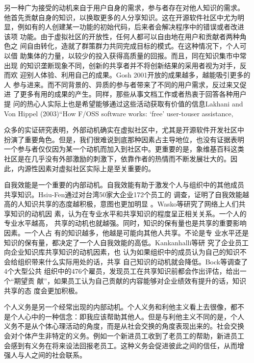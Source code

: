 \documentclass[12pt,a4paper]{ctexart}
\begin{document}
另一种广为接受的动机来自于用户自身的需求，参与者存在对他人知识的需求。
他首先贡献自身的知识，以换取更多的人分享知识。这在开源软件社区中尤为明
显，例如有的人创建某一功能的初始代码，后来者会解决程序中的错误或者改进
该项
功能。由于虚拟社区的开放性，任何人都可以自由地在用户和贡献者两种角色之
间自由转化，造就了群策群力共同完成目标的模式。在这种情况下，个人可以借
助集体的力量，以较少的投入获得高质量的回报。而且，同在知识集市中常出现
的知识垄断现象不同，创新的共享者并不将创新结果的采用者视为对手，反而欢
迎别人体验、利用自己的成果。Gosh 2001开放的成果越多，越能吸引更多的人
参与进来。而不同背景的、异质的参与者带来了不同的用户需求，反过来又促进
了更多有用的成果的产生。同样，那些从事文档工作或者热衷于回答各种用户提
问的热心人实际上也是希望能够通过这些活动获取有价值的信息Lakhani and Von Hippel (2003)“How F/OSS software works: ‘free’ user-touser
assistance,

众多的实证研究表明，外部动机确实在虚拟社区中，尤其是开源软件开发社区中
扮演了重要角色。但是，我们很难说到底那种因素占主导地位，也没有证据表明
一个参与者仅仅因为某一个动机而加入到社区中。更重要的是，象维基百科这类
社区是在几乎没有外部激励的刺激下，依靠作者的热情而不断发展壮大的。因
此，内源性因素对虚拟社区实际上是至关重要的。

自我效能是一个重要的内部动机。自我效能有助于激发个人与组织中的其他成员
共享知识。Hsiu-Fen通过对台湾50家大企业172个员工的
调查，证明了自我效能越高的人知识共享的态度越积极，意图也更加明显
\cite{Hsiu-FenLin04012007}。Wasko等研究了网络上人们共享知识的动机因
素，认为在专业水平和共享知识的程度呈正相关关系。一个人的专业水平越高，
共享的动机也就越强。同时，知识的保有量也是共享的重要影响因素。一个人占
有的知识越多，他越是可能向其他人共享\cite{1631335820050301}。不论是专
业水平还是知识的保有量，都决定了一个人自我效能的高低。Kankanhalli等研
究了企业员工向企业知识库共享知识的动机因素，也
认为如果组织中的成员认为自己的知识不会给组织带来什么实际用处的话，共享
自己知识的动机就会降低\cite{1631337020050301}。Bock等调查了4个大型公共
组织中的476个雇员，发现员工在共享知识前都会作出评估，给出一个“期望贡
献”，如果员工认为自己贡献的内容能够对企业绩效有提升的话，知识共享的态
度会更加积极\cite{631757820020401}。

个人义务是另一个经常出现的内部动机。个人义务和利他主义看上去很像，都不
是个人心中的一种信念：即我应该帮助其他人。但是与利他主义不同的是，个人
义务不是从个体心理活动的角度，而是从社会交换的角度表现出来的。社会交换
会对个体产生非特定的义务。例如一个新进员工收到了老员工的帮助，新进员工
会感到有义务在将来设法回报老员工。这种义务会促进彼此之间的信任，从而增
强人与人之间的社会联系\cite{gouldner1960nrp}。
\end{document}

